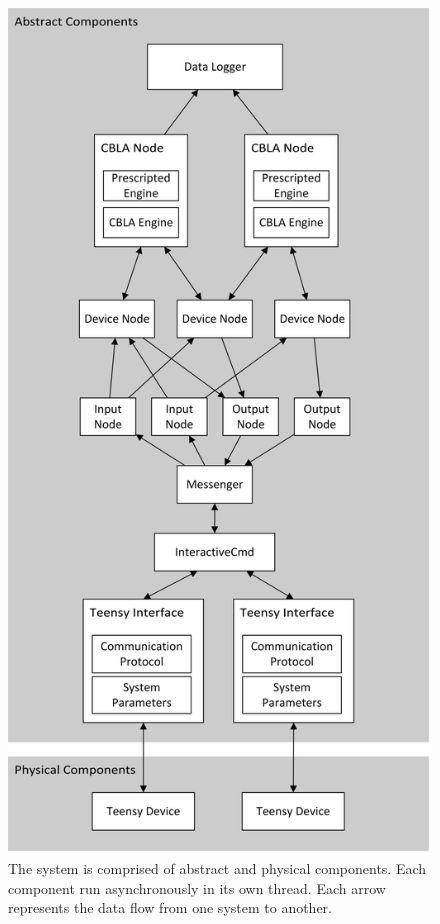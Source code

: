 \begin{figure} [!htbp]
	\centering
	\includegraphics[height=0.90 \textheight]{"fig/interactive control system/high-level system architecture"}
	\caption[High-level system architecture]{The system is comprised of abstract and physical components. Each component run asynchronously in its own thread. Each arrow represents the data flow from one system to another.}
	\label{fig:system-architecture}
\end{figure}


